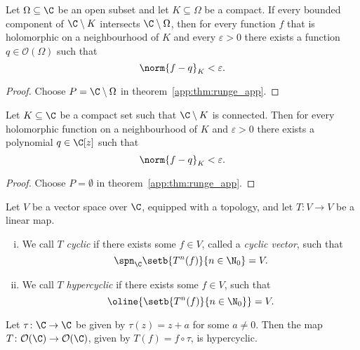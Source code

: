 \begin{izrek}
Let $\Omega \subseteq \C$ be an open subset and let
$K \subseteq \Omega$ be a compact. If every bounded component of
$\C \setminus K$ intersects $\C \setminus \Omega$, then for every
function $f$ that is holomorphic on a neighbourhood of $K$ and
every $\varepsilon > 0$ there exists a function
$q \in \mathcal{O}(\Omega)$ such that
\[
\norm{f - q}_K < \varepsilon.
\]
\end{izrek}

\begin{proof}
Choose $P = \C \setminus \Omega$ in
theorem~\ref{app:thm:runge_app}.
\end{proof}

\begin{posledica}
Let $K \subseteq \C$ be a compact set such that $\C \setminus K$ is
connected. Then for every holomorphic function on a neighbourhood
of $K$ and $\varepsilon > 0$ there exists a polynomial
$q \in \C[z]$ such that
\[
\norm{f - q}_K < \varepsilon.
\]
\end{posledica}

\begin{proof}
Choose $P = \emptyset$ in theorem~\ref{app:thm:runge_app}.
\end{proof}


\begin{definicija}
Let $V$ be a vector space over $\C$, equipped with a topology, and
let $T \colon V \to V$ be a linear map.

\begin{enumerate}[i)]
\item We call $T$ \emph{cyclic} if there exists
some $f \in V$, called a \emph{cyclic vector},
such that
\[
\spn_\C \setb{T^n(f)}{n \in \N_0} = V.
\]
\item We call $T$ \emph{hypercyclic} if
there exists some $f \in V$, such that
\[
\oline{\setb{T^n(f)}{n \in \N_0}} = V.
\]
\end{enumerate}
\end{definicija}

\begin{izrek}[Birkhoff]
Let $\tau \colon \C \to \C$ be given by $\tau(z) = z + a$ for some
$a \ne 0$. Then the map
$T \colon \mathcal{O}(\C) \to \mathcal{O}(\C)$, given by
$T(f) = f \circ \tau$, is hypercyclic.
\end{izrek}

